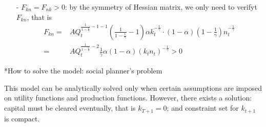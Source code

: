 \documentclass[10pt,landscape,a4paper]{article}
\makeatletter
\renewcommand{\subsection}{\@startsection{subsection}{1}{0mm}{.2ex}{.2ex}{\bfseries}}
\makeatother
\begin{document}
\begin{multicols*}{4}
\begin{itemize}
\begin{itemize}
        \item[-] $F_{kn}=F_{nk}>0$: by the symmetry of Hessian matrix, we only need to verifyt $F_{kn}$, that is
        \begin{align*}
            F_{kn} =& AQ_t^{\frac{1}{1-\frac{1}{\gamma}}-1-1}\left(\frac{1}{1-\frac{1}{\gamma}}-1\right)\alpha k_t^{-\frac{1}{\gamma}}\cdot (1-\alpha)(1-\frac{1}{\gamma})n_t^{-\frac{1}{\gamma}}\\
            =& AQ_t^{\frac{1}{1-\frac{1}{\gamma}}-2}\frac{1}{\gamma}\alpha(1-\alpha)(k_tn_t)^{-\frac{1}{\gamma}}>0
        \end{align*}
    \end{itemize}
\end{itemize}

\subsection*{How to solve the model: social planner's problem}

This model can be analytically solved only when certain assumptions are imposed on utility functions and production functions. However, there exists a solution: capital must be cleared eventually, that is $k_{T+1}=0$; and constraint set for $k_{t+1}$ is compact.

\vspace{2pt}


\end{multicols*}
\end{document}

